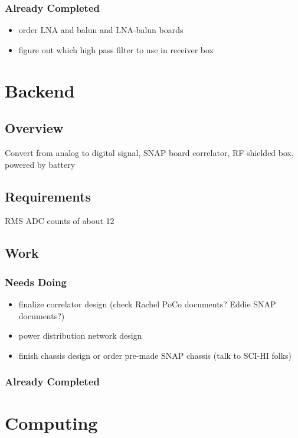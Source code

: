 \documentclass[11pt]{report}
\begin{document}
\subsubsection{Already Completed}
\begin{itemize}
 \item order LNA and balun and LNA-balun boards
 \item figure out which high pass filter to use in receiver box
\end{itemize}

\section{Backend}

\subsection{Overview}

Convert from analog to digital signal, SNAP board correlator, RF shielded box, 
powered by battery

\subsection{Requirements}

RMS ADC counts of about 12

\subsection{Work}

\subsubsection{Needs Doing}
\begin{itemize}
 \item finalize correlator design (check Rachel PoCo documents? Eddie SNAP 
  documents?)
 \item power distribution network design
 \item finish chassis design or order pre-made SNAP chassis (talk to SCI-HI 
  folks)
\end{itemize}

\subsubsection{Already Completed}

\section{Computing}
\end{document}
